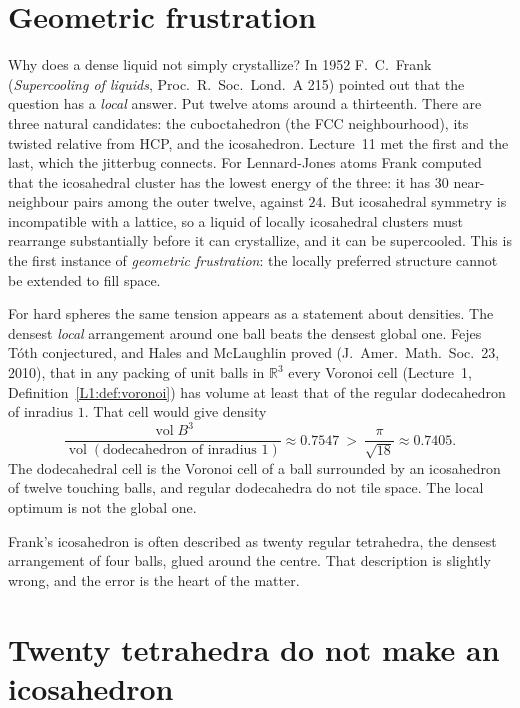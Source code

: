 \documentclass[11pt,openany]{book}
\theoremstyle{plain}
\theoremstyle{definition}
\theoremstyle{remark}
\newcommand{\R}{\mathbb{R}}
\newcommand{\vol}{\operatorname{vol}}
\newcommand{\Ball}{B}                  %
\begin{document}
\section{Geometric frustration}
\label{SM:sec:frustration}

Why does a dense liquid not simply crystallize? In 1952 F.~C.~Frank (\emph{Supercooling of liquids},
Proc.\ R.\ Soc.\ Lond.\ A 215) pointed out that the question has a \emph{local} answer. Put twelve atoms
around a thirteenth. There are three natural candidates: the cuboctahedron (the FCC neighbourhood), its
twisted relative from HCP, and the icosahedron. Lecture~11 met the first and the last, which the jitterbug
connects. For
Lennard-Jones atoms Frank computed that the icosahedral cluster has the lowest energy of the three: it
has $30$ near-neighbour pairs among the outer twelve, against $24$. But icosahedral symmetry is
incompatible with a lattice, so a liquid of locally icosahedral clusters must rearrange substantially
before it can crystallize, and it can be supercooled. This is the first instance of \emph{geometric
frustration}: the locally preferred structure cannot be extended to fill space.

For hard spheres the same tension appears as a statement about densities. The densest \emph{local}
arrangement around one ball beats the densest global one. Fejes T\'oth conjectured, and Hales and
McLaughlin proved (J.~Amer.\ Math.\ Soc.\ 23, 2010), that in any packing of unit balls in $\R^3$ every
Voronoi cell (Lecture~1, Definition~\ref{L1:def:voronoi}) has volume at least that of the regular
dodecahedron of inradius $1$. That cell would give density
\[
  \frac{\vol\Ball^3}{\vol(\text{dodecahedron of inradius }1)}\approx0.7547\ >\ \frac{\pi}{\sqrt{18}}\approx0.7405 .
\]
The dodecahedral cell is the Voronoi cell of a ball surrounded by an icosahedron of twelve touching balls,
and regular dodecahedra do not tile space. The local optimum is not the global one.

Frank's icosahedron is often described as twenty regular tetrahedra, the densest arrangement of four
balls, glued around the centre. That description is slightly wrong, and the error is the heart of the
matter.


\section{Twenty tetrahedra do not make an icosahedron}
\label{TET:sec}
\end{document}
